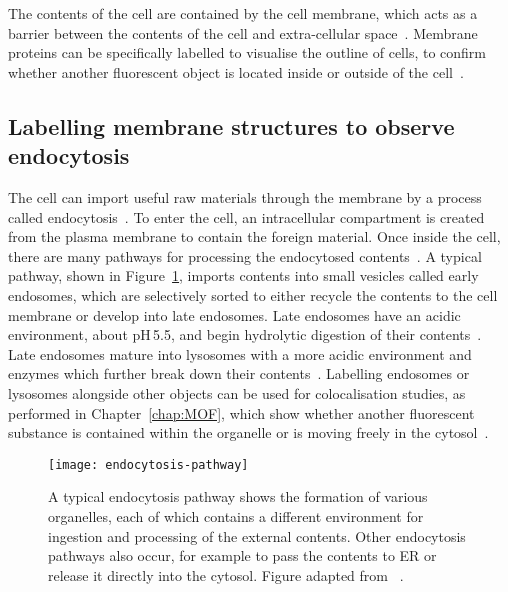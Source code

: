 The contents of the cell are contained by the cell membrane, which acts as a barrier between the contents of the cell and extra-cellular space~\cite[\textit{ch. 1}]{alberts2013essential}. 
Membrane proteins can be specifically labelled to visualise the outline of cells, to confirm whether another fluorescent object is located inside or outside of the cell~\cite{yano2009tag, lee2011fluorescent, chamma2017optimized}. 

\subsection{Labelling membrane structures to observe endocytosis}
The cell can import useful raw materials through the membrane by a process called endocytosis~\cite{alberts2002molecular}. 
To enter the cell, an intracellular compartment is created from the plasma membrane to contain the foreign material.
Once inside the cell, there are many pathways for processing the endocytosed contents~\cite{marsh2001endocytosis, marsh1999structural, mcmahon2011molecular}. 
A typical pathway, shown in Figure~\ref{fig:endocytosis-pathway}, imports contents into small vesicles called early endosomes, which are selectively sorted to either recycle the contents to the cell membrane or develop into late endosomes. 
Late endosomes have an acidic environment, about pH\,\num{5.5}, and begin hydrolytic digestion of their contents~\cite{geisow1984ph}. 
Late endosomes mature into lysosomes with a more acidic environment and enzymes which further break down their contents~\cite{alberts2002molecular}. 
Labelling endosomes or lysosomes alongside other objects can be used for colocalisation studies, as performed in Chapter~\ref{chap:MOF}, which show whether another fluorescent substance is contained within the organelle or is moving freely in the cytosol~\cite{pike2017quantifying}. 

\begin{figure}[!b]
\centering
\texttt{[image: endocytosis-pathway]}
\captionsetup{singlelinecheck=off}
\caption[Introduction: Cells import external contents through endocytosis]{A typical endocytosis pathway shows the formation of various organelles, each of which contains a different environment for ingestion and processing of the external contents. Other endocytosis pathways also occur, for example to pass the contents to ER or release it directly into the cytosol. Figure adapted from ~\cite{alberts2002molecular}. } 
\label{fig:endocytosis-pathway}
\end{figure}

